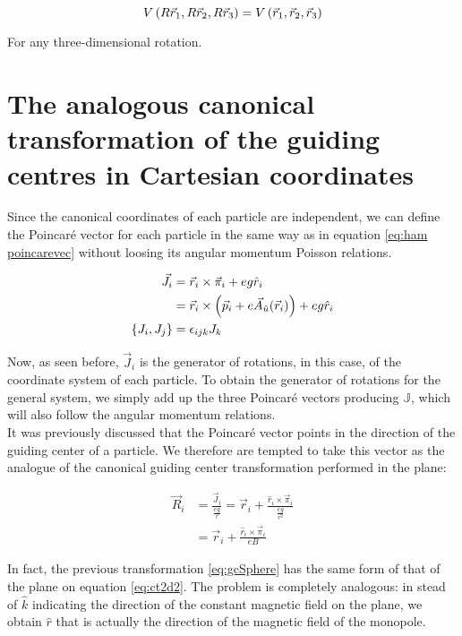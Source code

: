 \begin{equation*}
 V\left( R\vec{r}_1,R\vec{r}_2,R\vec{r}_3 \right) =  V\left( \vec{r}_1,\vec{r}_2,\vec{r}_3 \right) 
\end{equation*}

For any three-dimensional rotation.\\

\section{The analogous canonical transformation of the guiding centres in Cartesian coordinates}
Since the canonical coordinates of each particle are independent, we can define the Poincar\'e vector for each particle in the same way as in equation \eqref{eq:ham poincarevec} without loosing its angular momentum Poisson relations.

\begin{align*}
\vec{J}_i &= \vec{r}_i\times\vec{\pi}_i + eg\hat{r}_i\\
&= \vec{r}_i\times\left( \vec{p}_i+e\vec{A}_{\hat{u}}(\vec{r}_i) \right) + eg\hat{r}_i\\
\left\lbrace J_i, J_j \right\rbrace &= \epsilon_{ijk}J_k
\end{align*}

Now, as seen before, $\vec{J}_i$ is the generator of rotations, in this case, of the coordinate system of each particle. To obtain the generator of rotations for the general system, we simply add up the three Poincar\'e vectors producing $\mathbb{J}$, which will also follow the angular momentum relations.\\

It was previously discussed that the Poincar\'e vector points in the direction of the guiding center of a particle. We therefore are tempted to take this vector as the analogue of the canonical guiding center transformation performed in the plane:

\begin{align}
\vec{R}_i &= \frac{\vec{J}_i}{\frac{eg}{r}} = \vec{r}_i + \frac{\hat{r}_i\times\vec{\pi}_i}{\frac{eg}{r^2}} \nonumber\\
&= \vec{r}_i + \frac{\hat{r}_i\times\vec{\pi}_i}{eB}
\label{eq:gcSphere}
\end{align}

In fact, the previous transformation \eqref{eq:gcSphere} has the same form of that of the plane on equation \eqref{eq:ct2d2}. The problem is completely analogous: in stead of $\hat{k}$ indicating the direction of the constant magnetic field on the plane, we obtain $\hat{r}$ that is actually the direction of the magnetic field of the monopole. \\

